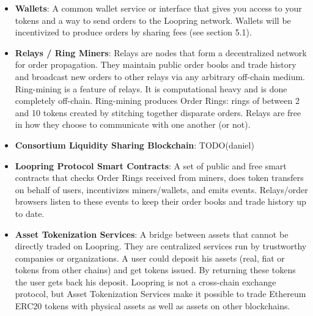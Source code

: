 \documentclass[UTF8,nofonts]{article}
\begin{document}
\begin{itemize}

\item \textbf{Wallets}: A common wallet service or interface that gives you access to your tokens and a way to send orders to the Loopring network. Wallets will be incentivized to produce orders by sharing fees (see section 5.1).

\item \textbf{Relays / Ring Miners}: Relays are nodes that form a decentralized network for order propagation. They maintain public order books and trade history and broadcast new orders to other relays via any arbitrary off-chain medium. Ring-mining is a feature of relays. It is computational heavy and is done completely off-chain. Ring-mining produces Order Rings: rings of between 2 and 10 tokens created by stitching together disparate orders. Relays are free in how they choose to communicate with one another (or not). 

\item \textbf{Consortium Liquidity Sharing Blockchain}: TODO(daniel)

\item \textbf{Loopring Protocol Smart Contracts}: A set of public and free smart contracts that checks Order Rings received from miners, does token transfers on behalf of users, incentivizes miners/wallets, and emits events. Relays/order browsers listen to these events to keep their order books and trade history up to date.

\item \textbf{Asset Tokenization Services}: A bridge between assets that cannot be directly traded on Loopring. They are centralized services run by trustworthy companies or organizations. A user could deposit his assets (real, fiat or tokens from other chains) and get tokens issued. By returning these tokens the user gets back his deposit. Loopring is not a cross-chain exchange protocol, but Asset Tokenization Services make it possible to trade Ethereum ERC20 \cite{ERC20} tokens with physical assets as well as assets on other blockchains. 

\end{itemize}
\end{document}
